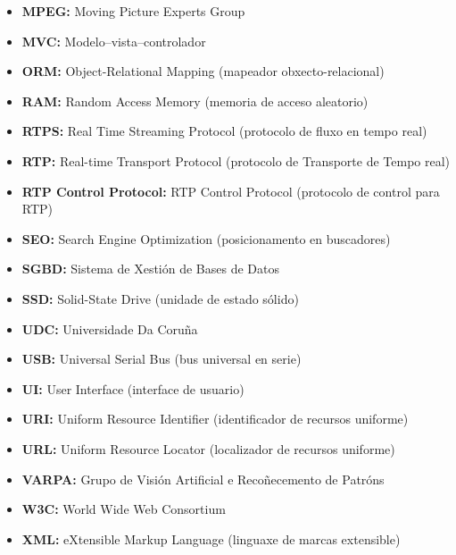 \begin{itemize}
    \item \textbf{MPEG:} Moving Picture Experts Group 
    \item \textbf{MVC:} Modelo–vista–controlador
    \item \textbf{ORM:} Object-Relational Mapping (mapeador obxecto-relacional)
    \item \textbf{RAM:} Random Access Memory (memoria de acceso aleatorio)
    \item \textbf{RTPS:} Real Time Streaming Protocol (protocolo de fluxo en tempo real)
    \item \textbf{RTP:} Real-time Transport Protocol (protocolo de Transporte de Tempo real)
    \item \textbf{RTP Control Protocol:} RTP Control Protocol (protocolo de control para RTP)
    \item \textbf{SEO:} Search Engine Optimization (posicionamento en buscadores)
    \item \textbf{SGBD:} Sistema de Xestión de Bases de Datos
    \item \textbf{SSD:} Solid-State Drive (unidade de estado sólido)
    \item \textbf{UDC:} Universidade Da Coruña
    \item \textbf{USB:} Universal Serial Bus (bus universal en serie)
    \item \textbf{UI:} User Interface (interface de usuario)
    \item \textbf{URI:} Uniform Resource Identifier (identificador de recursos uniforme)
    \item \textbf{URL:} Uniform Resource Locator (localizador de recursos uniforme)
    \item \textbf{VARPA:} Grupo de Visión Artificial e Recoñecemento de Patróns
    \item \textbf{W3C:} World Wide Web Consortium
    \item \textbf{XML:} eXtensible Markup Language (linguaxe de marcas extensible)
    
\end{itemize}




